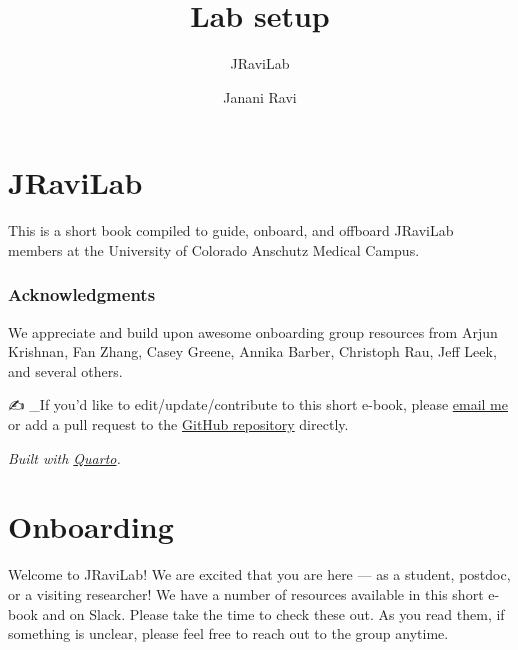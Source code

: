 \documentclass[
  letterpaper,
  DIV=11,
  numbers=noendperiod]{scrreprt}
\title{Lab setup}
\subtitle{JRaviLab}
\author{Janani Ravi}
\date{}
\renewcommand*\contentsname{Table of contents}
\newcommand\contentsname{Table of contents}
\begin{document}
\maketitle
\ifdefined\Shaded\renewenvironment{Shaded}{\begin{tcolorbox}[borderline west={3pt}{0pt}{shadecolor}, boxrule=0pt, enhanced, breakable, sharp corners, frame hidden, interior hidden]}{\end{tcolorbox}}\fi

\renewcommand*\contentsname{Table of contents}
{
\hypersetup{linkcolor=}
\setcounter{tocdepth}{2}
\tableofcontents
}

\hypertarget{jravilab}{%
\chapter*{JRaviLab}\label{jravilab}}

This is a short book compiled to guide, onboard, and offboard JRaviLab
members at the University of Colorado Anschutz Medical Campus.

\hypertarget{acknowledgments}{%
\subsection*{Acknowledgments}\label{acknowledgments}}

We appreciate and build upon awesome onboarding group resources from
Arjun Krishnan, Fan Zhang, Casey Greene, Annika Barber, Christoph Rau,
Jeff Leek, and several others.

✍️ \_If you'd like to edit/update/contribute to this short e-book,
please \href{mailto:janani.ravi@cuanschutz.edu}{email me} or add a pull
request to the \href{https://github.com/JRaviLab/lab_setup}{GitHub
repository} directly.

\emph{Built with \href{https://quarto.org/docs/books}{Quarto}.}


\hypertarget{onboarding}{%
\chapter{Onboarding}\label{onboarding}}

Welcome to JRaviLab! We are excited that you are here --- as a student,
postdoc, or a visiting researcher! We have a number of resources
available in this short e-book and on Slack. Please take the time to
check these out. As you read them, if something is unclear, please feel
free to reach out to the group anytime.
\end{document}
